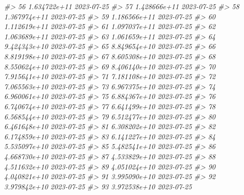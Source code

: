 \documentclass[
  xelatex, ja=standard]{bxjsbook}
\newenvironment{Shaded}{\begin{snugshade}}{\end{snugshade}}
\newcommand{\CommentTok}[1]{\textcolor[rgb]{0.56,0.35,0.01}{\textit{#1}}}
\theoremstyle{definition}
\theoremstyle{definition}
\theoremstyle{definition}
\theoremstyle{definition}
\theoremstyle{remark}
\begin{document}
\begin{Shaded}
\begin{Highlighting}[]
\CommentTok{\#\textgreater{} 56  1.634722e+11         2023{-}07{-}25}
\CommentTok{\#\textgreater{} 57  1.428666e+11         2023{-}07{-}25}
\CommentTok{\#\textgreater{} 58  1.367974e+11         2023{-}07{-}25}
\CommentTok{\#\textgreater{} 59  1.186566e+11         2023{-}07{-}25}
\CommentTok{\#\textgreater{} 60  1.112619e+11         2023{-}07{-}25}
\CommentTok{\#\textgreater{} 61  1.097037e+11         2023{-}07{-}25}
\CommentTok{\#\textgreater{} 62  1.063689e+11         2023{-}07{-}25}
\CommentTok{\#\textgreater{} 63  1.061659e+11         2023{-}07{-}25}
\CommentTok{\#\textgreater{} 64  9.424343e+10         2023{-}07{-}25}
\CommentTok{\#\textgreater{} 65  8.849654e+10         2023{-}07{-}25}
\CommentTok{\#\textgreater{} 66  8.819198e+10         2023{-}07{-}25}
\CommentTok{\#\textgreater{} 67  8.605308e+10         2023{-}07{-}25}
\CommentTok{\#\textgreater{} 68  8.550624e+10         2023{-}07{-}25}
\CommentTok{\#\textgreater{} 69  8.406140e+10         2023{-}07{-}25}
\CommentTok{\#\textgreater{} 70  7.915641e+10         2023{-}07{-}25}
\CommentTok{\#\textgreater{} 71  7.181108e+10         2023{-}07{-}25}
\CommentTok{\#\textgreater{} 72  7.065563e+10         2023{-}07{-}25}
\CommentTok{\#\textgreater{} 73  6.967375e+10         2023{-}07{-}25}
\CommentTok{\#\textgreater{} 74  6.960061e+10         2023{-}07{-}25}
\CommentTok{\#\textgreater{} 75  6.884367e+10         2023{-}07{-}25}
\CommentTok{\#\textgreater{} 76  6.740674e+10         2023{-}07{-}25}
\CommentTok{\#\textgreater{} 77  6.641499e+10         2023{-}07{-}25}
\CommentTok{\#\textgreater{} 78  6.568544e+10         2023{-}07{-}25}
\CommentTok{\#\textgreater{} 79  6.512477e+10         2023{-}07{-}25}
\CommentTok{\#\textgreater{} 80  6.461648e+10         2023{-}07{-}25}
\CommentTok{\#\textgreater{} 81  6.308202e+10         2023{-}07{-}25}
\CommentTok{\#\textgreater{} 82  6.174859e+10         2023{-}07{-}25}
\CommentTok{\#\textgreater{} 83  6.141227e+10         2023{-}07{-}25}
\CommentTok{\#\textgreater{} 84  5.535097e+10         2023{-}07{-}25}
\CommentTok{\#\textgreater{} 85  5.482541e+10         2023{-}07{-}25}
\CommentTok{\#\textgreater{} 86  4.668730e+10         2023{-}07{-}25}
\CommentTok{\#\textgreater{} 87  4.533829e+10         2023{-}07{-}25}
\CommentTok{\#\textgreater{} 88  4.511632e+10         2023{-}07{-}25}
\CommentTok{\#\textgreater{} 89  4.051024e+10         2023{-}07{-}25}
\CommentTok{\#\textgreater{} 90  4.040821e+10         2023{-}07{-}25}
\CommentTok{\#\textgreater{} 91  3.995090e+10         2023{-}07{-}25}
\CommentTok{\#\textgreater{} 92  3.979842e+10         2023{-}07{-}25}
\CommentTok{\#\textgreater{} 93  3.972538e+10         2023{-}07{-}25}

\end{Highlighting}
\end{Shaded}
\end{document}

